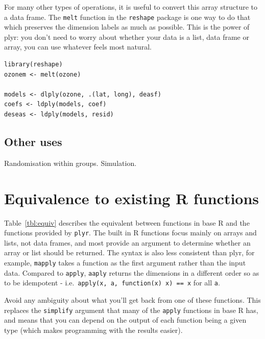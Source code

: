 \documentclass[letterpage]{scrartcl}
\begin{document}
For many other types of operations, it is useful to convert this array structure to a data frame.  The {\tt melt} function in the {\tt reshape} package is one way to do that which preserves the dimension labels as much as possible.  This is the power of plyr: you don't need to worry about whether your data is a list, data frame or array, you can use whatever feels most natural.

\begin{verbatim}
library(reshape)
ozonem <- melt(ozone)

models <- dlply(ozone, .(lat, long), deasf)
coefs <- ldply(models, coef)
deseas <- ldply(models, resid)

\end{verbatim}

\subsection{Other uses}

Randomisation within groups.  Simulation.

\section{Equivalence to existing R functions}
\label{sec:equiv}

Table~\ref{tbl:equiv} describes the equivalent between functions in base R and 
the functions provided by {\tt plyr}.  The built in R functions focus mainly on arrays and lists, not data frames, and most provide an argument to determine whether an array or list should be returned.  The syntax is also less consistent than plyr, for example, {\tt mapply} takes a function as the first argument rather than the input data.  Compared to {\tt apply}, {\tt aaply} returns the dimensions in a different order so as to be idempotent - i.e.\ {\tt apply(x, a, function(x) x) == x} for all {\tt a}. 

Avoid any ambiguity about what you'll get back from one of these functions. This replaces the {\tt simplify} argument that many of the {\tt apply} functions in base R has, and means that you can depend on the output of each function being a given type (which makes programming with the results easier).
\end{document}
